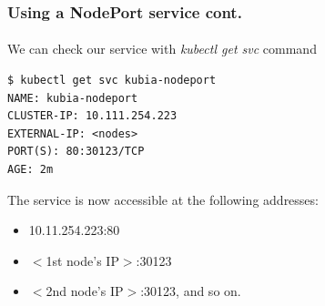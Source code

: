 \begin{frame}[fragile]
	\frametitle{Using a NodePort service cont.}
	\framesubtitle{}
	We can check our service with \textit{kubectl get svc} command
	\begin{lstlisting}[numbers=none, basicstyle=\ttfamily]
$ kubectl get svc kubia-nodeport
NAME: kubia-nodeport
CLUSTER-IP: 10.111.254.223
EXTERNAL-IP: <nodes>
PORT(S): 80:30123/TCP
AGE: 2m
	\end{lstlisting}
The service is now accessible at the following addresses:
\begin{itemize}
	\item 10.11.254.223:80
	\item $<$1st node's IP$>$:30123
	\item $<$2nd node's IP$>$:30123, and so on.
\end{itemize}
\end{frame}


